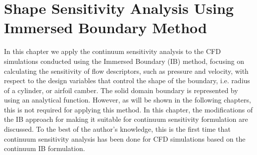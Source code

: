 \chapter{Shape Sensitivity Analysis Using Immersed Boundary Method}\label{ch:shapeSenwithIB}
In this chapter we apply the continuum sensitivity analysis to the CFD simulations conducted using the Immersed Boundary (IB) method, focusing on calculating the sensitivity of flow descriptors, such as pressure and velocity, with respect to the design variables that control the shape of the boundary, i.e. radius of a cylinder, or airfoil camber. The solid domain boundary is represented by using an analytical function. However, as will be shown in the following chapters, this is not required for applying this method. In this chapter, the modifications of the IB approach for making it suitable for continuum sensitivity formulation are discussed. To the best of the author's knowledge, this is the first time that continuum sensitivity analysis has been done for CFD simulations based on the continuum IB formulation.

